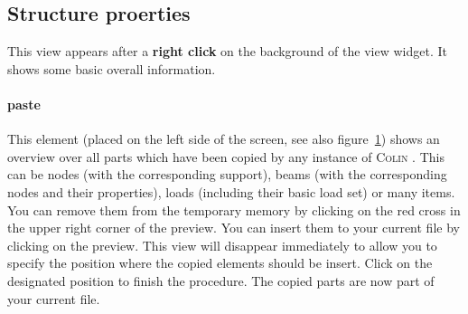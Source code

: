 \documentclass[a4paper,11pt]{report}
\newcommand{\Colin}[0]{\textsc{Colin }}
\begin{document}
\subsection{Structure proerties}
\label{sec:structdetail}


\begin{figure}[H]
\label{pic:generaloverlay}
\end{figure}

This view appears after a \textbf{right click} on the background of the view widget. It shows some basic overall information. 

\paragraph{paste}
This element (placed on the left side of the screen, see also figure~\ref{pic:generaloverlay}) shows an overview over all parts which have been copied by any instance of \Colin. This can be nodes (with the corresponding support), beams (with the corresponding nodes and their properties), loads (including their basic load set) or many items. You can remove them from the temporary memory by clicking on the red cross in the upper right corner of the preview. You can insert them to your current file by clicking on the preview. This view will disappear immediately to allow you to specify the position where the copied elements should be insert. Click on the designated position to finish the procedure. The copied parts are now part of your current file. 
\end{document}
